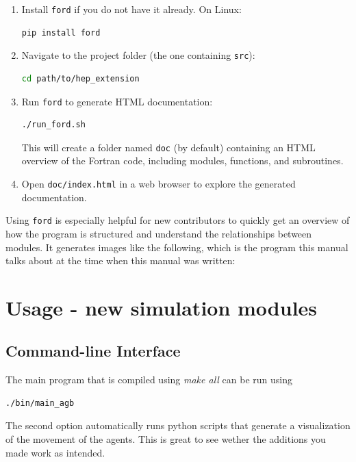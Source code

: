 \documentclass[11pt,a4paper]{article}
\begin{document}
\begin{enumerate}
    \item Install \texttt{ford} if you do not have it already. On Linux:
    \begin{lstlisting}[language=bash]
    pip install ford
    \end{lstlisting}

    \item Navigate to the project folder (the one containing \texttt{src}):

    \begin{lstlisting}[language=bash]
    cd path/to/hep_extension
    \end{lstlisting}

    \item Run \texttt{ford} to generate HTML documentation:

    \begin{lstlisting}[language=bash]
    ./run_ford.sh
    \end{lstlisting}

    This will create a folder named \texttt{doc} (by default) containing an HTML overview of the Fortran code, including modules, functions, and subroutines.

    \item Open \texttt{doc/index.html} in a web browser to explore the generated documentation.
\end{enumerate}

Using \texttt{ford} is especially helpful for new contributors to quickly get an overview of how the program is structured and understand the relationships between modules. It generates images like the following, which is the program this manual talks about at the time when this manual was written: 



\section{Usage - new simulation modules}
\subsection{Command-line Interface}
The main program that is compiled using \textit{make all} can be run using
\begin{lstlisting}[language=bash]
./bin/main_agb
\end{lstlisting}

The second option automatically runs python scripts that generate a visualization of the movement of the agents. This is great to see wether the additions you made work as intended. 
\end{document}
